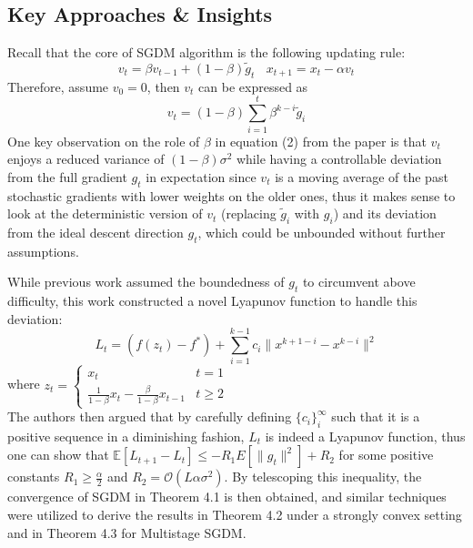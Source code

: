 \documentclass{article}
\begin{document}
\subsection{Key Approaches \& Insights}
Recall that the core of SGDM algorithm is the following updating rule:
\[
v_t = \beta v_{t - 1} + (1 - \beta)\tilde{g}_t \ \ \ \
x_{t + 1} = x_t - \alpha v_t
\]
Therefore, assume $v_0 = 0$, then $v_t$ can be expressed as 
\begin{equation}
v_t = (1 - \beta)\sum_{i = 1}^{t}\beta^{k - i}\tilde{g}_i
\end{equation}
One key observation on the role of $\beta$ in equation (2) from the paper is that $v_t$ enjoys a reduced variance of $(1 - \beta)\sigma^2$ while having a controllable deviation from the full gradient $g_t$ in expectation since $v_t$ is a moving average of the past stochastic gradients with lower weights on the older ones, thus it makes sense to look at the deterministic version of $v_t$ (replacing $\tilde{g}_i$ with $g_i$) and its deviation from the ideal descent direction $g_t$, which could be unbounded without further assumptions.

While previous work assumed the boundedness of $g_t$ to circumvent above difficulty, this work constructed a novel Lyapunov function to handle this deviation:
\begin{equation}
L_t = (f(z_t) - f^*) + \sum_{i = 1}^{k - 1}c_i\|x^{k + 1 - i} - x^{k - i}\|^2
\end{equation}
where $z_t = \begin{cases}
	x_t & t = 1 \\
	\frac{1}{1 - \beta}x_t - \frac{\beta}{1 - \beta}x_{t - 1} & t \geq 2
\end{cases}$\\

The authors then argued that by carefully defining $\{c_i\}_i^\infty$ such that it is a positive sequence in a diminishing fashion, $L_t$ is indeed a Lyapunov function, thus one can show that $\mathbb{E}[L_{t + 1} - L_t] \leq -R_1E[\|g_t\|^2] + R_2$ for some positive constants $R_1 \geq \frac{\alpha}{2}$ and $R_2 = \mathcal{O}(L\alpha\sigma^2)$. By telescoping this inequality, the convergence of SGDM in Theorem 4.1 is then obtained, and similar techniques were utilized to derive the results in Theorem 4.2 under a strongly convex setting and in Theorem 4.3 for Multistage SGDM.
\end{document}
